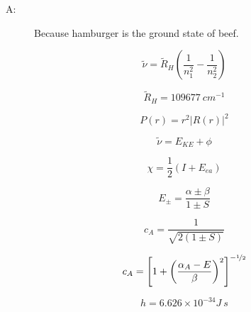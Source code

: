 \documentclass[12pt, letterpaper]{memoir}
\begin{document}
\begin{center}
		\begin{description}
			\item[A:] Because hamburger is the ground state of beef.
		\end{description}
		
				
	\end{center}
	
	\newpage

		\begin{minipage}{0.45\textwidth}
			
			\begin{equation*}
				\tilde{\nu}=\tilde{R}_H\left(\dfrac{1}{n_1^2}-\dfrac{1}{n_2^2}\right)
			\end{equation*}
			
			\begin{equation*}
				\tilde{R}_H=109677~cm^{-1}
			\end{equation*}
			
			\begin{equation*}
				P(r)=r^2\left|R(r)\right|^2
			\end{equation*}
			
			\begin{equation*}
				\tilde{\nu} = E_{KE} + \phi
			\end{equation*}
			
			\begin{equation*}
				\chi = \frac{1}{2}\left(I + E_{ea}\right)
			\end{equation*}
			
			\begin{equation*}
				E_\pm = \dfrac{\alpha\pm\beta}{1\pm S}
			\end{equation*}
			
			\begin{equation*}
				c_A=\dfrac{1}{\sqrt{2(1\pm S)}}
			\end{equation*}
			
			\begin{equation*}
				c_A = \left[1+\left(\dfrac{\alpha_A-E}{\beta}\right)^2\right]^{-\nicefrac{1}{2}}
			\end{equation*}
			
			\begin{equation*}
				h = 6.626\times10^{-34}J~s
			\end{equation*}
		
		\end{minipage}
\end{document}

